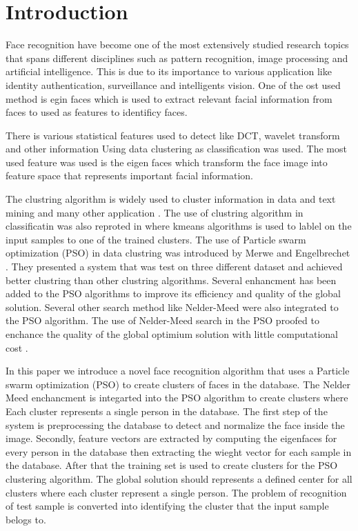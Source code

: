 \documentclass[a4paper,twoside]{article}
\begin{document}


%




\section{Introduction}

Face recognition have become one of the most extensively studied research topics that spans different disciplines such as pattern recognition, image processing and artificial intelligence. This is due to its importance to various application like identity authentication, surveillance and intelligents vision. One of the ost used method is egin faces which is used to extract relevant facial information from faces to used as features to identificy faces\cite{}.

There is various statistical features used to detect like DCT, wavelet transform and other information Using data clustering as classification was used. The most used feature was used is the eigen faces which transform the face image into feature space that represents important facial information.


The clustring algorithm is widely used to  cluster information in data and text mining and many other application \cite{}. The use of clustring algorithm in classificatin was also reproted in \cite{} where kmeans algorithms is used to lablel on the input samples to one of the trained clusters. 
The use of Particle swarm optimization (PSO) in data clustring was introduced by Merwe and Engelbrechet \cite{psoclustering}. They presented a system that was test on three different dataset and achieved better clustring than other clustring algorithms. Several enhancment has been added to the PSO algorithms to improve its efficiency and quality of the global solution. Several other search method like Nelder-Meed \cite{}  were also  integrated to the PSO algorithm. The use of Nelder-Meed search in the PSO proofed to enchance the quality of the global optimium solution with little computational cost \cite{}. 


In this paper we introduce a novel face recognition algorithm that uses a Particle swarm optimization (PSO) to create clusters of faces in the database. The Nelder Meed enchancment is integarted into the PSO algorithm to create clusters where Each cluster represents a single person in the database.  The first step of the system is preprocessing the database to detect and normalize the face inside the image. Secondly, feature vectors are extracted by computing the  eigenfaces for every person in the database then extracting the wieght vector for each sample in the database. After that the training set is used to create clusters for the PSO clustering algorithm. The global solution should represents a defined center for all clusters where each cluster represent a single person. The problem of recognition of test sample is converted into identifying the cluster that the input sample belogs to. %
\end{document}
